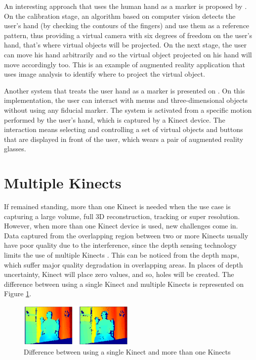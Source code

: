 \documentclass[msc, a4paper, classic, en]{ufbathesis}
\begin{document}
An interesting approach that uses the human hand as a marker is proposed by \cite{4373785}. On the calibration stage, an algorithm based on computer vision detects the user's hand (by checking the contours of the fingers) and use them as a reference pattern, thus providing a virtual camera with six degrees of freedom on the user's hand, that's where virtual objects will be projected. On the next stage, the user can move his hand arbitrarily and so the virtual object projected on his hand will move accordingly too. This is an example of augmented reality application that uses image analysis to identify where to project the virtual object.

Another system that treats the user hand as a marker is presented on \cite{51078809}. On this implementation, the user can interact with menus and three-dimensional objects without using any fiducial marker. The system is activated from a specific motion performed by the user's hand, which is captured by a Kinect device. The interaction means selecting and controlling a set of virtual objects and buttons that are displayed in front of the user, which wears a pair of augmented reality glasses. 

\section{Multiple Kinects}

If remained standing, more than one Kinect is needed when the use case is capturing a large volume, full 3D reconstruction, tracking or super resolution. However, when more than one Kinect device is used, new challenges come in. Data captured from the overlapping region between two or more Kinects usually have poor quality due to the interference, since the depth sensing technology limits the use of multiple Kinects \cite{roy}. This can be noticed from the depth maps, which suffer major quality degradation in overlapping areas. In places of depth uncertainty, Kinect will place zero values, and so, holes will be created. The difference between using a single Kinect and multiple Kinects is represented on Figure \ref{fig:twokin}. 

\begin{figure}
\centering
\includegraphics[width=0.5\textwidth]{images/twokin.png}
\caption{Difference between using a single Kinect and more than one Kinects}
\label{fig:twokin}
\end{figure}
\end{document}
